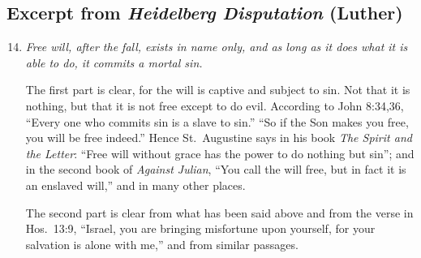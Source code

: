 \documentclass{bookclub}
\begin{document}
\begin{multicols}{2}

	\section{Excerpt from \emph{Heidelberg Disputation} (Luther)}
	\begin{enumerate}
		\setcounter{enumi}{13}
		\item \emph{Free will, after the fall, exists in name only, and as long as it does what it is able to do, it commits a mortal sin.}
		
		The first part is clear, for the will is captive and subject to sin. Not that it is nothing, but that it is not free except to do evil. According to John 8:34,36, ``Every one who commits sin is a slave to sin.'' ``So if the Son makes you free, you will be free indeed.'' Hence St.~Augustine says in his book \emph{The Spirit and the Letter}: ``Free will without grace has the power to do nothing but sin''; and in the second book of \emph{Against Julian}, ``You call the will free, but in fact it is an enslaved will,'' and in many other places.
		
		The second part is clear from what has been said above and from the verse in Hos.~13:9, ``Israel, you are bringing misfortune upon yourself, for your salvation is alone with me,'' and from similar passages.
		
		

\end{enumerate}
\end{multicols}
\end{document}
